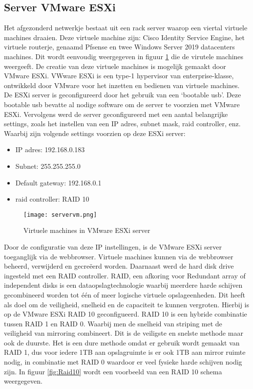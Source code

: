 \subsection{Server VMware ESXi}
Het afgezonderd netwerkje bestaat uit een rack server waarop een viertal virtuele machines draaien. Deze virtuele machine zijn: Cisco Identity Service Engine, het virtuele routerje, genaamd Pfsense en twee  Windows Server 2019 datacenters machines. Dit wordt eenvoudig weergegeven in figuur \ref{fig:vms} die de virutele machines weergeeft. De creatie van deze virtuele machines is mogelijk gemaakt door VMware ESXi. VWware ESXi is een type-1 hypervisor van enterprise-klasse, ontwikkeld door VMware voor het inzetten en bedienen van virtuele machines. 
\newline
\newline
De ESXi server is geconfigureerd door het gebruik van een ‘bootable usb’. Deze bootable usb bevatte al nodige software om de server te voorzien met VMware ESXi. Vervolgens werd de server geconfigureerd met een aantal belangrijke settings, zoals het instellen van een IP adres, subnet mask, raid controller, enz. Waarbij zijn volgende settings voorzien op deze ESXi server: 

\begin{itemize}
	\item IP adres: 192.168.0.183
	\item Subnet: 255.255.255.0
	\item Default gateway: 192.168.0.1
	\item raid controller: RAID 10
\end{itemize}

\begin{figure}[H]
	\centering
	\texttt{[image: servervm.png]}
	\caption{Virtuele machines in VMware ESXi server}
	\label{fig:vms}
\end{figure}

\newpage
Door de configuratie van deze IP instellingen, is de VMware ESXi server toeganglijk via de webbrowser. Virtuele machines kunnen via de webbrowser beheerd, verwijderd en gecreëerd worden. Daarnaast werd de hard disk drive ingesteld met een RAID controller. RAID, een afkoring voor Redundant array of independent disks is een dataopslagtechnologie waarbij meerdere harde schijven gecombineerd worden tot één of meer logische virtuele opslageenheden. Dit heeft als doel om de veiligheid, snelheid en de capaciteit te kunnen vergroten. Hierbij is op de VMware ESXi RAID 10 geconfigueerd. RAID 10 is een hybride combinatie tussen RAID 1 en RAID 0. Waarbij men de snelheid van striping met de veiligheid van mirroring combineert. 
\newline
\newline
Dit is de veiligste en snelste methode maar ook de duurste. Het is een dure methode omdat er gebruik wordt gemaakt van RAID 1, dus voor iedere 1TB aan opslagruimte is er ook 1TB aan mirror ruimte nodig, in combinatie met RAID 0 waardoor er veel fysieke harde schijven nodig zijn. In figuur \ref{fig:Raid10} wordt een voorbeeld van een RAID 10 schema weergegeven.

